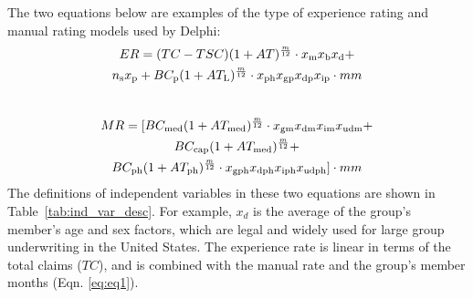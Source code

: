\documentclass[letterpaper]{article} %
\begin{document}
The two equations below are examples of the type of experience rating and manual rating models used by Delphi:
\setlength{\belowdisplayskip}{0pt} \setlength{\belowdisplayshortskip}{0pt}
\setlength{\abovedisplayskip}{0pt} \setlength{\abovedisplayshortskip}{0pt}
\begin{multline*}
ER =  (TC - TSC ) (1 +  AT )^\frac{m}{12} \cdot  x_{\rm m} x_{\rm b} x_{\rm d}  +  \\  n_{\rm s}x_{\rm p} 
           + BC_{\rm p} (1 + AT_{\rm L} )^\frac{m}{12} \cdot x_{\rm ph} x_{\rm gp} x_{\rm dp} x_{\rm ip} \cdot mm
\end{multline*}
\\
\begin{multline*}   
MR = [ BC_{\rm med} (1 + AT_{\rm med})^\frac{m}{12} \cdot x_{\rm gm}x_{\rm dm}x_{\rm im}x_{\rm udm} + \\ BC_{\rm cap} (1 + AT_{\rm med})^\frac{m}{12}+ \\
            BC_{\rm ph}  (1 + AT_{\rm ph}  )^\frac{m}{12}  \cdot x_{\rm gph}x_{\rm dph}x_{\rm iph}x_{\rm udph} ] \cdot mm \\
\end{multline*}  
The definitions of independent variables in these two equations are shown in Table~\ref{tab:ind_var_desc}. For example, $x_{d}$ is the average of the group's member's age and sex factors, which are legal and widely used for large group underwriting in the United States.  The experience rate is linear in terms of the total claims ($TC$), and is combined with the manual rate and the group's member months (Eqn. \ref{eq:eq1}).
\end{document}
